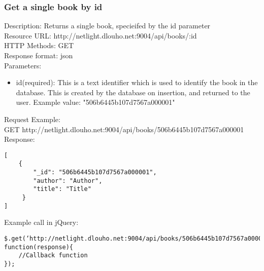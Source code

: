 \subsubsection{Get a single book by id}
Description: Returns a single book, specieifed by the id parameter		\\
\newline
Resource URL: http://netlight.dlouho.net:9004/api/books/:id	\\
HTTP Methods: GET		\\
Response format: json	\\
\newline
Parameters:
\begin{itemize}

\item id(required): This is a text identifier which is used to identify the book in the database. This is created by the database on insertion, and returned to the user. Example value: "506b6445b107d7567a000001"

\end{itemize}
Request Example:		\\
GET		http://netlight.dlouho.net:9004/api/books/506b6445b107d7567a000001	\\
\newline
Response:
\begin{verbatim}
[
    {
        "_id": "506b6445b107d7567a000001",
        "author": "Author",
        "title": "Title"
     }
]
\end{verbatim}
Example call in jQuery:
\begin{verbatim}
$.get(‘http://netlight.dlouho.net:9004/api/books/506b6445b107d7567a000001’, function(response){
	//Callback function
});
\end{verbatim}


